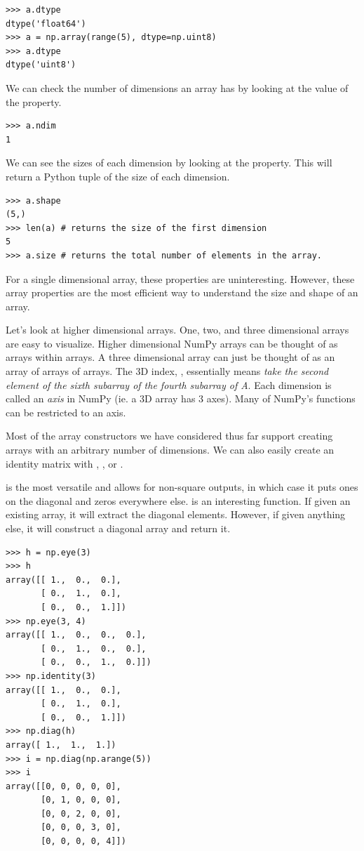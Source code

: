 \begin{lstlisting}
>>> a.dtype
dtype('float64')
>>> a = np.array(range(5), dtype=np.uint8) 
>>> a.dtype
dtype('uint8') 
\end{lstlisting} 

We can check the number of dimensions an
array has by looking at the value of the  property. 
\begin{lstlisting}
>>> a.ndim
1 
\end{lstlisting} 

We can see the sizes of each dimension by looking at
the  property. This will return a Python tuple of the size of
each dimension. 
\begin{lstlisting}
>>> a.shape
(5,)
>>> len(a) # returns the size of the first dimension
5 
>>> a.size # returns the total number of elements in the array. 
\end{lstlisting} 

For a single dimensional array, these properties are
uninteresting. However, these array properties are the most efficient way 
to understand the size and shape of an array.

Let's look at higher dimensional arrays. One, two, and three dimensional
arrays are easy to visualize. Higher dimensional NumPy arrays can be
thought of as arrays within arrays. A three dimensional array can just
be thought of as an array of arrays of arrays. The 3D index, , essentially means \emph{take the second element of the sixth
subarray of the fourth subarray of A}. Each dimension is called an
\emph{axis} in NumPy (ie. a 3D array has 3 axes).  
Many of NumPy's functions can be restricted to an axis. 

Most of the array constructors we have considered thus far support 
creating arrays with an arbitrary number of dimensions. 
We can also easily create an identity matrix with , ,
 or . 
 
 is the most versatile and allows for non-square outputs, 
in which case it puts ones on the diagonal and zeros everywhere else. 
 is an interesting function.  If given an existing array, 
it will extract the diagonal elements. However, if given anything else, 
it will construct a diagonal array and return it. 

\begin{lstlisting}
>>> h = np.eye(3) 
>>> h
array([[ 1.,  0.,  0.],
       [ 0.,  1.,  0.],
       [ 0.,  0.,  1.]])
>>> np.eye(3, 4)
array([[ 1.,  0.,  0.,  0.],
       [ 0.,  1.,  0.,  0.],
       [ 0.,  0.,  1.,  0.]])
>>> np.identity(3)
array([[ 1.,  0.,  0.],
       [ 0.,  1.,  0.],
       [ 0.,  0.,  1.]])
>>> np.diag(h)
array([ 1.,  1.,  1.])
>>> i = np.diag(np.arange(5))
>>> i
array([[0, 0, 0, 0, 0],
       [0, 1, 0, 0, 0],
       [0, 0, 2, 0, 0],
       [0, 0, 0, 3, 0],
       [0, 0, 0, 0, 4]])
\end{lstlisting} 

